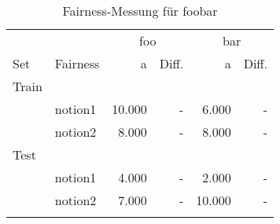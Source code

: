 \begin{table}[ht]
  \caption{Fairness-Messung für foobar }%
  \begin{tabular}{llrrrr}
    \toprule
    & & \multicolumn{ 2 }{c}{ foo }& \multicolumn{ 2 }{c}{ bar } \\
    \cmidrule(lr){ 3-4}\cmidrule(l){ 5-6}
    Set & Fairness
    & a  & Diff.& a  & Diff. \\
    \midrule
      Train\\
      & notion1
      & 10.000 %
      & - 
      & 6.000 %
      & - 
      \\
      & notion2
      & 8.000 %
      & - 
      & 8.000 %
      & - 
      \\
      \addlinespace
      Test\\
      & notion1
      & 4.000 %
      & - 
      & 2.000 %
      & - 
      \\
      & notion2
      & 7.000 %
      & - 
      & 10.000 %
      & - 
      \\
      \addlinespace
    \bottomrule
  \end{tabular}
\end{table}
